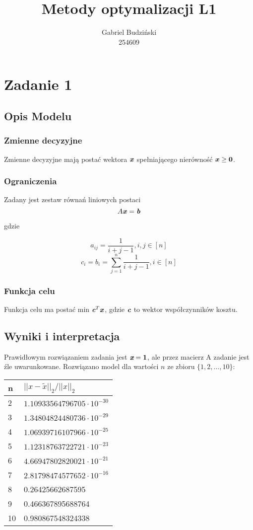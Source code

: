 \documentclass{article}
\title{Metody optymalizacji L1}
\author{Gabriel Budziński\\254609}
\begin{document}
\maketitle

\section{Zadanie 1}
\subsection{Opis Modelu}
\subsubsection{Zmienne decyzyjne}
Zmienne decyzyjne mają postać wektora $\textbf{\textit{x}}$ spełniającego nierówność $\textbf{\textit{x}} \geq \textbf{0}$.
\subsubsection{Ograniczenia}
Zadany jest zestaw równań liniowych postaci
\[A\textbf{\textit{x}}=\textbf{\textit{b}}\]

gdzie

\[a_{ij} = \frac{1}{i+j-1}, i,j \in [n]\]
\[c_i = b_i = \sum_{j=1}^n{\frac{1}{i+j-1}}, i \in [n]\]

\subsubsection{Funkcja celu}
Funkcja celu ma postać min ${\textit{{\textbf{c}}}}^T \textbf{\textit{x}}$, gdzie $\textbf{\textit{c}}$ to wektor współczynników kosztu.
\subsection{Wyniki i interpretacja}
Prawidłowym rozwiązaniem zadania jest $\textit{\textbf{x}}=\textbf{1}$, ale przez macierz A zadanie jest źle uwarunkowane.
Rozwiązano model dla wartości $n$ ze zbioru $\{1,2,\dots,10\}$:

\begin{table}[H]
\centering
\begin{tabular}{|l|l|}\hline
n & $||x-\tilde{x}||_2/||x||_2$\\\hline
2 & $1.10933564796705\cdot 10^{-30}$\\\hline
3 & $1.34804824480736\cdot 10^{-29}$\\\hline
4 & $1.06939716107966\cdot 10^{-25}$\\\hline
5 & $1.12318763722721\cdot 10^{-23}$\\\hline
6 & $4.66947802820021\cdot 10^{-21}$\\\hline
7 & $2.81798474577652\cdot 10^{-16}$\\\hline
8 & 0.26425662687595\\\hline
9 & 0.466367895688764\\\hline
10 & 0.980867548324338\\\hline
\end{tabular}
\end{table}
\end{document}
